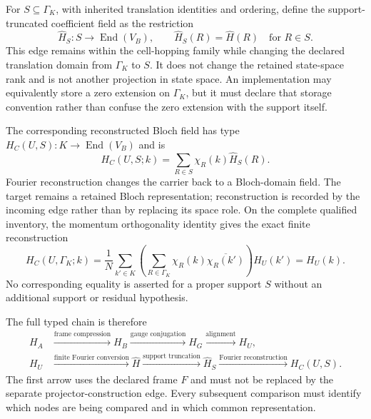 For $S\subseteq\Gamma_K$, with inherited translation identities and ordering,
define the support-truncated coefficient field as the restriction
\begin{equation}
  \widehat H_S:S\longrightarrow\operatorname{End}(V_B),
  \qquad
  \widehat H_S(R)=\widehat H(R)\quad\text{for }R\in S.
  \label{eq:representation-carrier-support-truncation}
\end{equation}
This edge remains within the cell-hopping family while changing the declared
translation domain from $\Gamma_K$ to $S$. It does not change the retained
state-space rank and is not another projection in state space. An implementation
may equivalently store a zero extension on $\Gamma_K$, but it must declare that
storage convention rather than confuse the zero extension with the support
itself.

The corresponding reconstructed Bloch field has type
$H_C(U,S):K\to\operatorname{End}(V_B)$ and is
\begin{equation}
  H_C(U,S;k)
  =\sum_{R\in S}\chi_R(k)\widehat H_S(R).
  \label{eq:representation-carrier-reconstruction}
\end{equation}
Fourier reconstruction changes the carrier back to a Bloch-domain field. The
target remains a retained Bloch representation; reconstruction is recorded by
the incoming edge rather than by replacing its space role. On the complete
qualified inventory, the momentum orthogonality identity gives the exact
finite reconstruction
\begin{equation}
  H_C(U,\Gamma_K;k)
  =\frac{1}{N}\sum_{k'\in K}
    \left(\sum_{R\in\Gamma_K}
      \chi_R(k)\overline{\chi_R(k')}\right)H_U(k')
  =H_U(k).
  \label{eq:representation-carrier-complete-reconstruction}
\end{equation}
No corresponding equality is asserted for a proper support $S$ without an
additional support or residual hypothesis.

The full typed chain is therefore
\begin{equation}
  \begin{aligned}
    H_A
    &\xrightarrow{\text{frame compression}} H_B
     \xrightarrow{\text{gauge conjugation}} H_G
     \xrightarrow{\text{alignment}} H_U,\\
    H_U
    &\xrightarrow{\text{finite Fourier conversion}} \widehat H
     \xrightarrow{\text{support truncation}} \widehat H_S
     \xrightarrow{\text{Fourier reconstruction}} H_C(U,S).
  \end{aligned}
  \label{eq:representation-carrier-full-chain}
\end{equation}
The first arrow uses the declared frame $F$ and must not be replaced by the
separate projector-construction edge. Every subsequent comparison must identify
which nodes are being compared and in which common representation.

